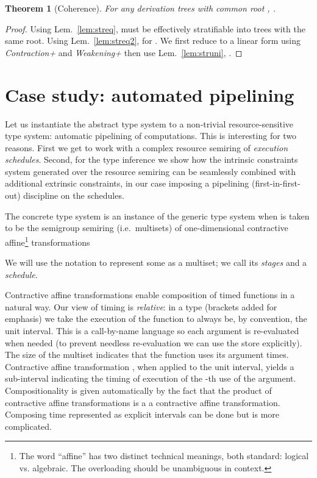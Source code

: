 \documentclass{article}
\newtheorem{theorem}{Theorem}
\begin{document}
\begin{theorem}[Coherence]
For any   derivation trees  with common root ,  .
\end{theorem}
\begin{proof}
  Using Lem.~\ref{lem:streq},  must be effectively stratifiable into
   trees  with the same root. Using Lem.~\ref{lem:streq2},
   for
  . We first reduce  to a linear form using \emph{Contraction+} and \emph{Weakening+} then use Lem.~\ref{lem:struni},
  . 
\end{proof}


\section{Case study: automated pipelining}\label{chap:pipes}
Let us instantiate the abstract type system to a non-trivial resource-sensitive type system: automatic pipelining of computations.  This is interesting for two reasons. First we get to work with a complex resource semiring of \emph{execution schedules}. Second, for the type inference we show how the intrinsic constraints system generated over the resource semiring can be seamlessly combined with additional extrinsic constraints, in our case imposing a pipelining (first-in-first-out) discipline on the schedules. 

The concrete type system is an instance of the generic type system when  is taken to be the semigroup semiring (i.e.\ multisets) of one-dimensional contractive affine\footnote{The word ``affine'' has two distinct technical meanings, both standard: logical vs. algebraic. The overloading should be unambiguous in context.} transformations

We will use the notation  to represent some  as a multiset; we call  its \emph{stages} and  a \emph{schedule}.

Contractive affine transformations enable composition of timed functions in a natural way. Our view of timing is \emph{relative}: in a type  (brackets added for emphasis) we take the execution of the function to always be, by convention, the unit interval. This is a call-by-name language so each argument is re-evaluated when needed (to prevent needless re-evaluation we can use the store explicitly). The size of the multiset indicates that the function uses its argument  times. Contractive affine transformation , when applied to the unit interval, yields a sub-interval indicating the timing of execution of the -th use of the argument. Compositionality is given automatically by the fact that the product of contractive affine transformations is a a contractive affine transformation. Composing time represented as explicit intervals can be done but is more complicated. 
\end{document}
